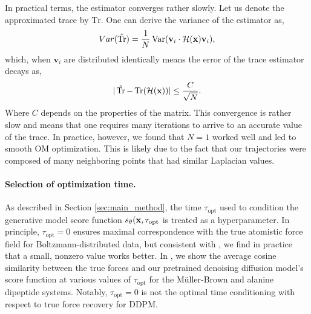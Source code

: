 In practical terms, the estimator converges rather slowly. Let us denote the approximated trace by $\operatorname{\hat{Tr}}$. One can derive the variance of the estimator as,
\begin{equation}
    Var(\operatorname{\hat{Tr}}) = \frac{1}{N} \operatorname{Var}(\mathbf{v}_i \cdot \mathcal{H}(\mathbf{x}) \mathbf{v}_i),
\end{equation}
which, when $\mathbf{v}_i$ are distributed identically means the error of the trace estimator decays as,
\begin{equation}
    |\operatorname{\hat{Tr}} - \operatorname{Tr}(\mathcal{H}(\mathbf{x}))| \leq \frac{C}{\sqrt{N}}.
\end{equation}
Where $C$ depends on the properties of the matrix. This convergence is rather slow and means that one requires many iterations to arrive to an accurate value of the trace. In practice, however, we found that $N = 1$ worked well and led to smooth OM optimization. This is likely due to the fact that our trajectories were composed of many neighboring points that had similar Laplacian values.


\paragraph{Selection of optimization time.}
As described in Section \ref{sec:main_method}, the time $\tau_\text{opt}$ used to condition the generative model score function $s_\theta(\mathbf{x}, \tau_\text{opt}$ is treated as a hyperparameter. In principle, $\tau_\text{opt} = 0$ ensures maximal correspondence with the true atomistic force field for Boltzmann-distributed data, but consistent with \citet{arts2023two}, we find in practice that a small, nonzero value works better. In , we show the average cosine similarity between the true forces and our pretrained denoising diffusion model's score function at various values of $\tau_\text{opt}$ for the Müller-Brown and alanine dipeptide systems. Notably, $\tau_\text{opt}=0$ is not the optimal time conditioning with respect to true force recovery for DDPM.

